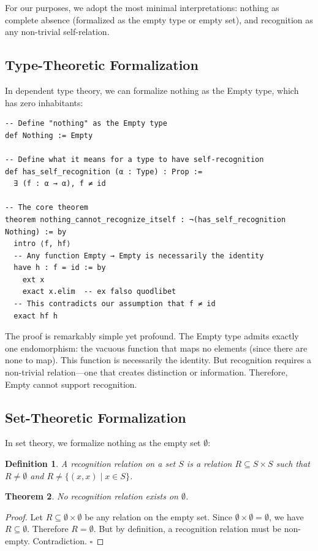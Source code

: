\documentclass[12pt,a4paper]{article}
\newtheorem{theorem}{Theorem}
\newtheorem{definition}[theorem]{Definition}
\begin{document}
For our purposes, we adopt the most minimal interpretations: nothing as complete absence (formalized as the empty type or empty set), and recognition as any non-trivial self-relation.

\subsection{Type-Theoretic Formalization}

In dependent type theory, we can formalize nothing as the Empty type, which has zero inhabitants:

\begin{verbatim}
-- Define "nothing" as the Empty type
def Nothing := Empty

-- Define what it means for a type to have self-recognition
def has_self_recognition (α : Type) : Prop :=
  ∃ (f : α → α), f ≠ id

-- The core theorem
theorem nothing_cannot_recognize_itself : ¬(has_self_recognition Nothing) := by
  intro ⟨f, hf⟩
  -- Any function Empty → Empty is necessarily the identity
  have h : f = id := by
    ext x
    exact x.elim  -- ex falso quodlibet
  -- This contradicts our assumption that f ≠ id
  exact hf h
\end{verbatim}

The proof is remarkably simple yet profound. The Empty type admits exactly one endomorphism: the vacuous function that maps no elements (since there are none to map). This function is necessarily the identity. But recognition requires a non-trivial relation---one that creates distinction or information. Therefore, Empty cannot support recognition.

\subsection{Set-Theoretic Formalization}

In set theory, we formalize nothing as the empty set $\emptyset$:

\begin{definition}
A recognition relation on a set $S$ is a relation $R \subseteq S \times S$ such that $R \neq \emptyset$ and $R \neq \{(x,x) \mid x \in S\}$.
\end{definition}

\begin{theorem}
No recognition relation exists on $\emptyset$.
\end{theorem}

\begin{proof}
Let $R \subseteq \emptyset \times \emptyset$ be any relation on the empty set.
Since $\emptyset \times \emptyset = \emptyset$, we have $R \subseteq \emptyset$.
Therefore $R = \emptyset$.
But by definition, a recognition relation must be non-empty.
Contradiction. $\square$
\end{proof}
\end{document}
